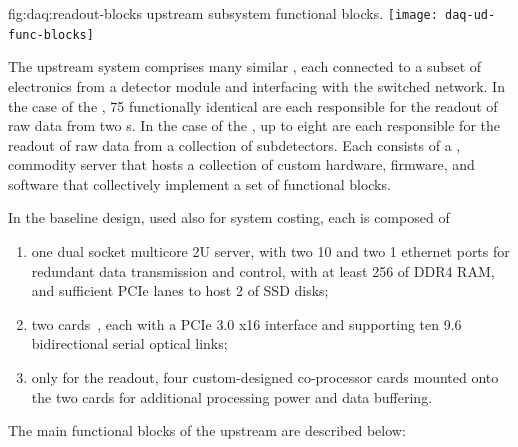 \begin{dunefigure}{fig:daq:readout-blocks}{ upstream
     subsystem functional blocks.}
 \texttt{[image: daq-ud-func-blocks]}
\end{dunefigure}

The upstream  system comprises many similar , each
connected to a subset of electronics from a detector module and
interfacing with the  switched network. In the case of the
, 75 functionally identical  are each responsible for the readout of raw data from two
s. In the case of the , up to eight  are each responsible for the
readout of raw data from a collection of  subdetectors. 
Each  consists of a , commodity server that hosts a
collection of custom hardware, 
firmware, and software that collectively implement a set of functional blocks.

In the baseline design, used also for system costing, each  is composed of
\begin{enumerate}
\item one dual socket multicore 2U server, with two \SI{10}{\Gbps} and two \SI{1}{\Gbps} ethernet ports for redundant data transmission and control, with at least \SI{256}{\GB} of DDR4 RAM, and sufficient PCIe lanes to host \SI{2}{\TB} of SSD disks;
\item two  cards~\cite{atlas-felix}, each with a PCIe 3.0 x16 interface and supporting ten \SI{9.6}{\Gbps} bidirectional serial optical links;
\item only for the  readout, four custom-designed co-processor cards mounted onto the two  cards for additional processing power and data buffering.

\end{enumerate}

The main functional blocks of the upstream  are described below:

